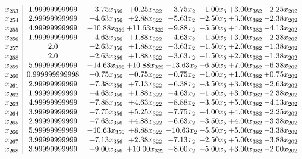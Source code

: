 \documentclass[8pt]{article}
\begin{document}
\[\begin{array}{c| c c@{\hskip 2pt} c@{\hskip 2pt} c@{\hskip 2pt} c@{\hskip 2pt} c@{\hskip 2pt} c@{\hskip 2pt} }
 x_{253}   &  1.99999999999 & -3.75 x_{356} & +  0.25 x_{322} & -3.75 x_{2} & -1.00 x_{5} & +  3.00 x_{382} & -2.25 x_{202}\\
 x_{254}   &  2.99999999999 & -4.63 x_{356} & +  2.88 x_{322} & -5.63 x_{2} & -2.50 x_{5} & +  3.00 x_{382} & -2.38 x_{202}\\
 x_{255}   &  4.99999999999 & -10.88 x_{356} & + 11.63 x_{322} & -9.88 x_{2} & -5.50 x_{5} & +  4.00 x_{382} & -4.13 x_{202}\\
 x_{256}   &  1.99999999999 & -4.63 x_{356} & +  1.88 x_{322} & -4.63 x_{2} & -1.50 x_{5} & +  3.00 x_{382} & -2.38 x_{202}\\
 x_{257}   &  2.0 & -2.63 x_{356} & +  1.88 x_{322} & -3.63 x_{2} & -1.50 x_{5} & +  2.00 x_{382} & -1.38 x_{202}\\
 x_{258}   &  2.0 & -2.63 x_{356} & +  1.88 x_{322} & -3.63 x_{2} & -1.50 x_{5} & +  2.00 x_{382} & -1.38 x_{202}\\
 x_{259}   &  5.99999999999 & -14.63 x_{356} & + 10.88 x_{322} & -13.63 x_{2} & -6.50 x_{5} & +  7.00 x_{382} & -6.38 x_{202}\\
 x_{260}   &  0.999999999998 & -0.75 x_{356} & -0.75 x_{322} & -0.75 x_{2} & -1.00 x_{5} & +  1.00 x_{382} & +  0.75 x_{202}\\
 x_{261}   &  2.99999999999 & -7.38 x_{356} & +  7.13 x_{322} & -6.38 x_{2} & -3.50 x_{5} & +  3.00 x_{382} & -2.63 x_{202}\\
 x_{262}   &  1.99999999999 & -4.63 x_{356} & +  1.88 x_{322} & -4.63 x_{2} & -1.50 x_{5} & +  3.00 x_{382} & -2.38 x_{202}\\
 x_{263}   &  4.99999999999 & -7.88 x_{356} & +  4.63 x_{322} & -8.88 x_{2} & -3.50 x_{5} & +  5.00 x_{382} & -4.13 x_{202}\\
 x_{264}   &  3.99999999999 & -7.75 x_{356} & +  5.25 x_{322} & -7.75 x_{2} & -4.00 x_{5} & +  4.00 x_{382} & -2.25 x_{202}\\
 x_{265}   &  2.99999999999 & -7.63 x_{356} & +  4.88 x_{322} & -6.63 x_{2} & -3.50 x_{5} & +  4.00 x_{382} & -3.38 x_{202}\\
 x_{266}   &  5.99999999999 & -10.63 x_{356} & +  8.88 x_{322} & -10.63 x_{2} & -5.50 x_{5} & +  5.00 x_{382} & -3.38 x_{202}\\
 x_{267}   &  3.99999999999 & -7.13 x_{356} & +  2.38 x_{322} & -7.13 x_{2} & -2.50 x_{5} & +  5.00 x_{382} & -3.88 x_{202}\\
 x_{268}   &  3.99999999999 & -9.00 x_{356} & + 10.00 x_{322} & -8.00 x_{2} & -5.00 x_{5} & +  3.00 x_{382} & -2.00 x_{202}\\

\end{array}\]
\end{document}
